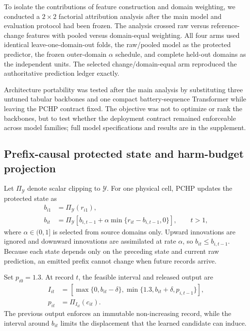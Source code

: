\documentclass[preprint,12pt]{elsarticle}
\begin{document}
To isolate the contributions of feature construction and domain weighting, we conducted a $2\times2$ factorial attribution analysis after the main model and evaluation protocol had been frozen. The analysis crossed raw versus reference-change features with pooled versus domain-equal weighting. All four arms used identical leave-one-domain-out folds, the raw/pooled model as the protected predictor, the frozen outer-domain $\alpha$ schedule, and complete held-out domains as the independent units. The selected change/domain-equal arm reproduced the authoritative prediction ledger exactly.

Architecture portability was tested after the main analysis by substituting three untuned tabular backbones and one compact battery-sequence Transformer while leaving the PCHP contract fixed. The objective was not to optimize or rank the backbones, but to test whether the deployment contract remained enforceable across model families; full model specifications and results are in the supplement.


\subsection{Prefix-causal protected state and harm-budget projection}

Let \(\Pi_{\mathcal Y}\) denote scalar clipping to \(\mathcal Y\). For one physical cell, PCHP updates the protected state as
\begin{align}
  b_{i1}&=\Pi_{\mathcal Y}(r_{i1}),\\
  b_{it}&=\Pi_{\mathcal Y}\!\left[b_{i,t-1}
  +\alpha\min\{r_{it}-b_{i,t-1},0\}\right],\qquad t>1,
  \label{eq:causal_state}
\end{align}
where \(\alpha\in(0,1]\) is selected from source domains only. Upward innovations are ignored and downward innovations are assimilated at rate \(\alpha\), so \(b_{it}\leq b_{i,t-1}\). Because each state depends only on the preceding state and current raw prediction, an emitted prefix cannot change when future records arrive.

Set \(p_{i0}=1.3\). At record \(t\), the feasible interval and released output are
\begin{align}
 I_{it}
 &=\left[\max\{0,b_{it}-\delta\},
 \min\{1.3,b_{it}+\delta,p_{i,t-1}\}\right],
 \label{eq:feasible_interval}\\
 p_{it}&=\Pi_{I_{it}}(c_{it}).
 \label{eq:method}
\end{align}
The previous output enforces an immutable non-increasing record, while the interval around \(b_{it}\) limits the displacement that the learned candidate can induce.
\end{document}
